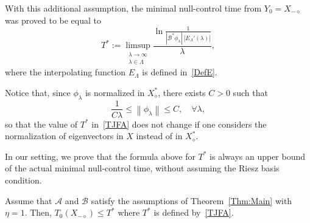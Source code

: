 \documentclass[AHL,Unicode,longabstracts]{cedram}
\newcommand\A{\mathcal{A}}
\newcommand\B{\mathcal{B}}
\newcommand\Bs{\mathcal{B}^*}
\newcommand{\Xalphas}{X_\diamond^*}
\newcommand{\Xmalpha}{X_{-\diamond}}
\newcommand{\Fzp}{Y_0}
\newcommand{\normeX}[1]{\left\| #1 \right\|}
\let\oldforall\forall
\renewcommand*{\forall}{\mathrel{\oldforall}}
\begin{document}
\begingroup
With this additional assumption, the minimal null-control time from $\Fzp=\Xmalpha$ was proved to be equal to
\begin{equation}\label{TJFA}
T^*:=\limsup_{\substack{\lambda\to \infty\\ \lambda\in \Lambda}} \frac{\ln \frac{1}{| \Bs\phi_\lambda | \: | E_\Lambda' (\lambda) |}}{ \lambda },
\end{equation}
where the interpolating function $E_\Lambda$ is defined in~\eqref{DefE}.
\endgroup

\begin{rema}
Notice that, since $\phi_\lambda$ is normalized in $\Xalphas$, there exists $C>0$ such that
\[
\frac{1}{C \lambda} \leq \normeX{\phi_\lambda} \leq C, \quad \forall \lambda,
\]
so that the value of $T^*$ in~\eqref{TJFA} does not change if one considers the normalization of eigenvectors in $X$ instead of in $\Xalphas$.
\end{rema}

In our setting, we prove that the formula above for $T^*$ is always an upper bound of the actual minimal null-control time, without assuming the Riesz basis condition.

\begin{prop}\label{Prop:T_0<T*}
Assume that $\A$ and $\B$ satisfy the assumptions of Theorem~\ref{Thm:Main} with $\eta=1$. Then, $T_0(\Xmalpha) \leq T^*$ where $T^*$ is defined by~\eqref{TJFA}.
\end{prop}
\end{document}
